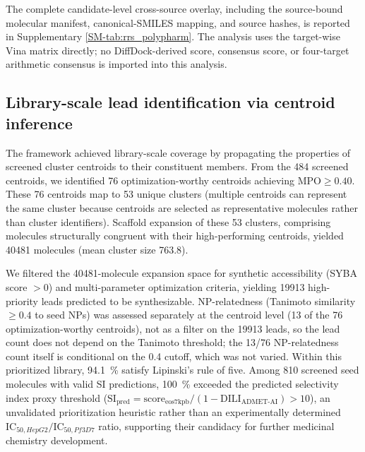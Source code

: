 \documentclass[journal=jcisd8,manuscript=article]{achemso}
\begin{document}
The complete candidate-level cross-source overlay, including the source-bound molecular manifest, canonical-SMILES mapping, and source hashes, is reported in Supplementary \cref{SM-tab:rrs_polypharm}. The analysis uses the target-wise Vina matrix directly; no DiffDock-derived score, consensus score, or four-target arithmetic consensus is imported into this analysis.

\subsection{Library-scale lead identification via centroid inference}
\label{sec:lead_identification}

The framework achieved library-scale coverage by propagating the properties of screened cluster centroids to their constituent members. From the \num{484}
screened centroids, we identified \num{76} optimization-worthy centroids achieving $\text{MPO} \geq \num{0.40}$. These \num{76} centroids map to \num{53}
unique clusters (multiple centroids can represent the same cluster because centroids are selected as representative molecules rather than cluster identifiers).
Scaffold expansion of these \num{53} clusters, comprising molecules structurally congruent with their high-performing centroids, yielded \num{40481} molecules
(mean cluster size \num{763.8}).

We filtered the \num{40481}-molecule expansion space for synthetic accessibility (SYBA score $>\num{0}$) and multi-parameter optimization criteria, yielding
\num{19913} high-priority leads predicted to be synthesizable. NP-relatedness (Tanimoto similarity $\geq \num{0.4}$ to seed NPs) was assessed separately at the
centroid level (\num{13} of the \num{76} optimization-worthy centroids), not as a filter on the \num{19913} leads, so the lead count does not depend on the
Tanimoto threshold; the \num{13}/\num{76} NP-relatedness count itself is conditional on the \num{0.4} cutoff, which was not varied. Within this prioritized
library, \qty{94.1}{\percent} satisfy Lipinski's rule of five. Among \num{810} screened seed molecules with valid SI predictions, \qty{100}{\percent} exceeded
the predicted selectivity index proxy threshold ($\text{SI}_{\text{pred}} = \text{score}_{\text{eos7kpb}} / (1 - \text{DILI}_{\text{ADMET-AI}}) > \num{10}$),
an unvalidated prioritization heuristic rather than an experimentally determined $\text{IC}_{50, HepG2} / \text{IC}_{50, Pf3D7}$ ratio, supporting their
candidacy for further medicinal chemistry development.
\end{document}
